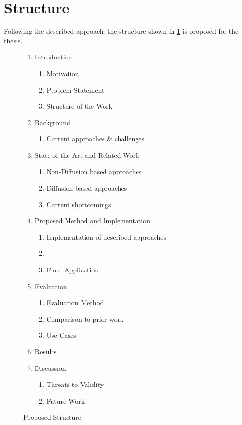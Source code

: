 \documentclass[10pt,a4paper]{scrartcl} %
\begin{document}
\section{Structure}
\label{sec:structure}
Following the described approach, the structure shown in \cref{fig:Structure} is proposed for the thesis.

\begin{figure}[h]
		\caption{Proposed Structure}
	\begin{enumerate}[label*=\arabic*.]
		\item Introduction
		\begin{enumerate}[label*=\arabic*]
			\item Motivation
			\item Problem Statement
			\item Structure of the Work
		\end{enumerate}
		\item Background
		\begin{enumerate}[label*=\arabic*]
      \item Current approaches \& challenges
		\end{enumerate}
		\item State-of-the-Art and Related Work
		\begin{enumerate}[label*=\arabic*]
      \item Non-Diffusion based approaches
			\item Diffusion based approaches
			\item Current shortcomings
		\end{enumerate}
		\item Proposed Method and Implementation
		\begin{enumerate}[label*=\arabic*]
      \item Implementation of described approaches
      \item 
      \item Final Application
		\end{enumerate}	
		\item Evaluation
		\begin{enumerate}[label*=\arabic*]
			\item Evaluation Method
			\item Comparison to prior work
			\item Use Cases
		\end{enumerate}
		\item Results
		\item Discussion
		\begin{enumerate}[label*=\arabic*]
			\item Threats to Validity
			\item Future Work
		\end{enumerate}
		
		
	\end{enumerate}
	\label{fig:Structure}
\end{figure}


\pagebreak


\end{document}
